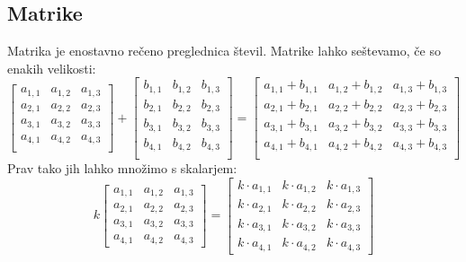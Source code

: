\documentclass[a4paper, 12px]{article}
\begin{document}
\subsection{Matrike}
    Matrika je enostavno rečeno preglednica števil. Matrike lahko seštevamo, če so enakih velikosti:
    $$\begin{bmatrix}
        a_{1,1} & a_{1,2} & a_{1,3} \\
        a_{2,1} & a_{2,2} & a_{2,3} \\
        a_{3,1} & a_{3,2} & a_{3,3} \\
        a_{4,1} & a_{4,2} & a_{4,3} \\
    \end{bmatrix} + \begin{bmatrix}
        b_{1,1} & b_{1,2} & b_{1,3} \\
        b_{2,1} & b_{2,2} & b_{2,3} \\
        b_{3,1} & b_{3,2} & b_{3,3} \\
        b_{4,1} & b_{4,2} & b_{4,3} \\
    \end{bmatrix} = \begin{bmatrix}
        a_{1,1}+b_{1,1} & a_{1,2}+b_{1,2} & a_{1,3}+b_{1,3} \\
        a_{2,1}+b_{2,1} & a_{2,2}+b_{2,2} & a_{2,3}+b_{2,3} \\
        a_{3,1}+b_{3,1} & a_{3,2}+b_{3,2} & a_{3,3}+b_{3,3} \\
        a_{4,1}+b_{4,1} & a_{4,2}+b_{4,2} & a_{4,3}+b_{4,3} \\
    \end{bmatrix}$$
    Prav tako jih lahko množimo s skalarjem:
    $$k \begin{bmatrix}
        a_{1,1} & a_{1,2} & a_{1,3} \\
        a_{2,1} & a_{2,2} & a_{2,3} \\
        a_{3,1} & a_{3,2} & a_{3,3} \\
        a_{4,1} & a_{4,2} & a_{4,3}
    \end{bmatrix} = \begin{bmatrix}
        k \cdot a_{1,1} & k \cdot a_{1,2} & k \cdot a_{1,3} \\
        k \cdot a_{2,1} & k \cdot a_{2,2} & k \cdot a_{2,3} \\
        k \cdot a_{3,1} & k \cdot a_{3,2} & k \cdot a_{3,3} \\
        k \cdot a_{4,1} & k \cdot a_{4,2} & k \cdot a_{4,3}
    \end{bmatrix}$$
\end{document}

